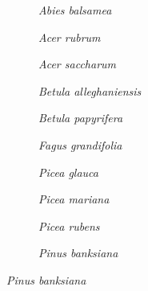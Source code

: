 \documentclass[letterpaper, 12pt]{article}
\theoremstyle{theo}
\begin{document}
\begin{refsection}
\begin{onehalfspace}
	
	\begin{figure}[htb]
		\centering
		\begin{subfigure}{0.25\textwidth}
			
			\caption{\textit{Abies balsamea}}
			\label{fig::abibal_az_0}
		\end{subfigure}
		\hfil
		\begin{subfigure}{0.25\textwidth}
			
			\caption{\textit{Acer rubrum}}
			\label{fig::acerub_az_0}
		\end{subfigure}
		\hfil
		\begin{subfigure}{0.25\textwidth}
			
			\caption{\textit{Acer saccharum}}
			\label{fig::acesac_az_0}
		\end{subfigure}
		\medskip
		\begin{subfigure}{0.25\textwidth}
			
			\caption{\textit{Betula alleghaniensis}}
			\label{fig::betall_az_0}
		\end{subfigure}
		\hfil
		\begin{subfigure}{0.25\textwidth}
			
			\caption{\textit{Betula papyrifera}}
			\label{fig::betpap_az_0}
		\end{subfigure}
		\hfil
		\begin{subfigure}{0.25\textwidth}
			
			\caption{\textit{Fagus grandifolia}}
			\label{fig::faggran_az_0}
		\end{subfigure}
		\medskip
		\begin{subfigure}{0.25\textwidth}
			
			\caption{\textit{Picea glauca}}
			\label{fig::picgla_az_0}
		\end{subfigure}
		\hfil
		\begin{subfigure}{0.25\textwidth}
			
			\caption{\textit{Picea mariana}}
			\label{fig::picmar_az_0}
		\end{subfigure}
		\hfil
		\begin{subfigure}{0.25\textwidth}
			
			\caption{\textit{Picea rubens}}
			\label{fig::picrub_az_0}
		\end{subfigure}
		\medskip
		\begin{subfigure}{0.25\textwidth}
			
			\caption{\textit{Pinus banksiana}}
			\label{fig::pinban_az_0}
		\end{subfigure}

\end{figure}
\end{onehalfspace}
\end{refsection}
\end{document}
